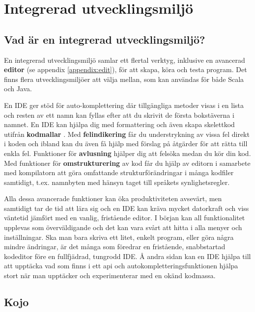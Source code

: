 
\chapter{Integrerad utvecklingsmiljö}\label{appendix:ide}

\section{Vad är en integrerad utvecklingsmiljö?}

En integrerad utvecklingsmiljö  samlar ett flertal verktyg, inklusive en avancerad \textbf{editor} (se appendix \ref{appendix:edit}), för att skapa, köra och testa program. Det finns flera utvecklingsmiljöer att välja mellan, som kan användas för både Scala och Java.

En IDE ger stöd för auto-komplettering  där tillgängliga metoder visas i en lista och resten av ett namn kan fyllas efter att du skrivit de första bokstäverna i namnet. En IDE kan hjälpa dig med formattering och även skapa skelettkod utifrån \textbf{kodmallar} . Med \textbf{felindikering}  får du understrykning av vissa fel direkt i koden och ibland kan du även få hjälp med förslag på åtgärder för att rätta till enkla fel. Funktioner för \textbf{avlusning}  hjälper dig att felsöka medan du kör din kod. Med funktioner för \textbf{omstrukturering}  av kod får du hjälp av editorn i samarbete med kompilatorn att göra omfattande strukturförändringar i många kodfiler samtidigt, t.ex. namnbyten med hänsyn taget till språkets synlighetsregler.  

Alla dessa avancerade funktioner kan öka produktiviteten avsevärt, men samtidigt tar de tid att lära sig och en IDE kan kräva mycket datorkraft och viss väntetid jämfört med en vanlig, fristående editor. I början kan all funktionalitet upplevas som överväldigande och det kan vara svårt att hitta i alla menyer och inställningar. Ska man bara skriva ett litet, enkelt program, eller göra några mindre ändringar, är det många som föredrar en fristående, snabbstartad kodeditor före en fullfjädrad, tungrodd IDE. Å andra sidan kan en IDE hjälpa till att upptäcka vad som finns i ett api och autokompletteringsfunktionen hjälpa stort när man upptäcker och experimenterar med en okänd kodmassa.


\section{Kojo}\label{appendix:kojo}

